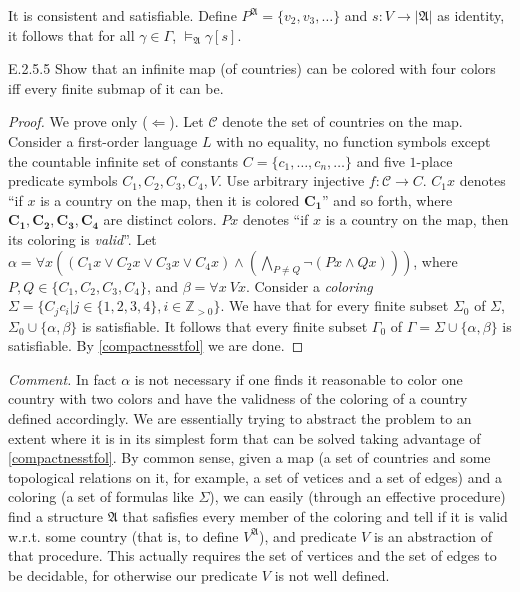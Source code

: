 It is consistent and satisfiable. Define $P^{\mathfrak{A}}=\{v_2,v_3,\dots\}$ and $s:V\rightarrow|\mathfrak{A}|$ as identity, it follows that for all $\gamma\in \Gamma$, $\vDash_{\mathfrak{A}}\gamma[s]$.

\begin{exercise}{E.2.5.5}
  Show that an infinite map (of countries) can be colored with four colors iff every finite submap of it can be.
\end{exercise}

\begin{proof}
  We prove only ($\Leftarrow$). Let $\mathcal{C}$ denote the set of countries on the map. Consider a first-order language $L$ with no equality, no function symbols except the countable infinite set of constants $C=\{c_1,\dots,c_n,\dots\}$ and five $1$-place predicate symbols $C_1,C_2,C_3,C_4,V$. Use arbitrary injective $f:\mathcal{C}\rightarrow C$. $C_1x$ denotes ``if $x$ is a country on the map, then it is colored $\mathbf{C_1}$'' and so forth, where $\mathbf{C_1,C_2,C_3,C_4}$ are distinct colors. $Px$ denotes ``if $x$ is a country on the map, then its coloring is \textit{valid}''. Let $\alpha=\forall x ((C_1x\vee C_2x\vee C_3x\vee C_4x)\wedge (\bigwedge_{P\neq Q}\neg(Px\wedge Qx)))$, where $P,Q\in\{C_1,C_2,C_3,C_4\}$, and $\beta=\forall x\ Vx$. Consider a \textit{coloring} $\Sigma=\{C_jc_i|j\in\{1,2,3,4\}, i\in\mathbb{Z}_{>0}\}$. We have that for every finite subset $\Sigma_0$ of $\Sigma$, $\Sigma_0\cup\{\alpha,\beta\}$ is satisfiable. It follows that every finite subset $\Gamma_0$ of $\Gamma=\Sigma\cup\{\alpha,\beta\}$ is satisfiable. By \ref{compactnesstfol} we are done.
\end{proof}

\textit{Comment.} In fact $\alpha$ is not necessary if one finds it reasonable to color one country with two colors and have the validness of the coloring of a country defined accordingly. We are essentially trying to abstract the problem to an extent where it is in its simplest form that can be solved taking advantage of \ref{compactnesstfol}. By common sense, given a map (a set of countries and some topological relations on it, for example, a set of vetices and a set of edges) and a coloring (a set of formulas like $\Sigma$), we can easily (through an effective procedure) find a structure $\mathfrak{A}$ that safisfies every member of the coloring and tell if it is valid w.r.t. some country (that is, to define $V^{\mathfrak{A}}$), and predicate $V$ is an abstraction of that procedure. This actually requires the set of vertices and the set of edges to be decidable, for otherwise our predicate $V$ is not well defined.

